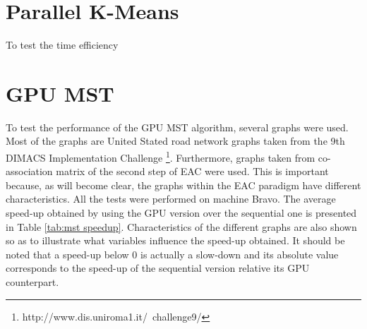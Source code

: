 %
%

\section{Parallel K-Means}
\label{sec:parallel kmeans}

To test the time efficiency 

%
%

\section{GPU MST}
\label{sec:gpu mst}


To test the performance of the GPU MST algorithm, several graphs were used.
Most of the graphs are United Stated road network graphs taken from the 9th DIMACS Implementation Challenge \footnote{http://www.dis.uniroma1.it/~challenge9/}.
Furthermore, graphs taken from co-association matrix of the second step of EAC were used.
This is important because, as will become clear, the graphs within the EAC paradigm have different characteristics.
All the tests were performed on machine Bravo.
The average speed-up obtained by using the GPU version over the sequential one is presented in Table \ref{tab:mst speedup}.
Characteristics of the different graphs are also shown so as to illustrate what variables influence the speed-up obtained.
It should be noted that a speed-up below 0 is actually a slow-down and its absolute value corresponds to the speed-up of the sequential version relative its GPU counterpart.



